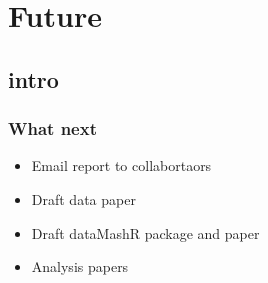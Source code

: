 \documentclass[t]{beamer}
\begin{document}
\section{Future} \subsection{intro}
\begin{frame}[c]  \frametitle{What next}
\begin{center}
\begin{itemize}
		\item Email report to collabortaors \\[\baselineskip] 
		\item Draft data paper \\[\baselineskip] 
		\item Draft dataMashR package and paper \\[\baselineskip] 
		\item Analysis papers \\[\baselineskip] 
	\end{itemize}
\end{center}
\end{frame}
\end{document}
